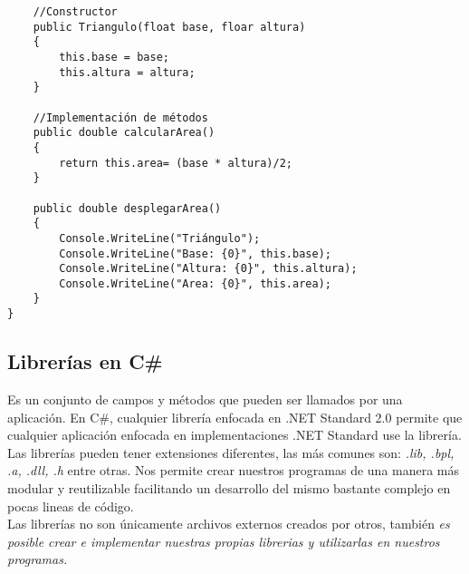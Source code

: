 \documentclass[letterpaper, 12pt]{article}
\begin{document}
\begin{justify}
\begin{verbatim}
    //Constructor
    public Triangulo(float base, floar altura)
    {
        this.base = base;
        this.altura = altura;
    }

    //Implementación de métodos
    public double calcularArea()
    {
        return this.area= (base * altura)/2;
    }

    public double desplegarArea()
    {
        Console.WriteLine("Triángulo");
        Console.WriteLine("Base: {0}", this.base);
        Console.WriteLine("Altura: {0}", this.altura);
        Console.WriteLine("Area: {0}", this.area);
    }
}
            \end{verbatim}
            \subsection{Librerías en C\#}
            Es un conjunto de campos y métodos que pueden ser llamados por una aplicación. En C\#, cualquier librería enfocada en .NET Standard 2.0 permite que cualquier
            aplicación enfocada en implementaciones .NET Standard use la librería. Las librerías pueden tener extensiones diferentes, las más comunes son: \emph{.lib, .bpl, .a, .dll, .h}
            entre otras. Nos permite crear nuestros programas de una manera más modular y reutilizable facilitando un desarrollo del mismo bastante complejo en pocas lineas de código.\newline
            \\
            Las librerías no son únicamente archivos externos creados por otros, también \emph{es posible crear e implementar nuestras propias librerias y utilizarlas en nuestros programas.}


\end{justify}
\end{document}
